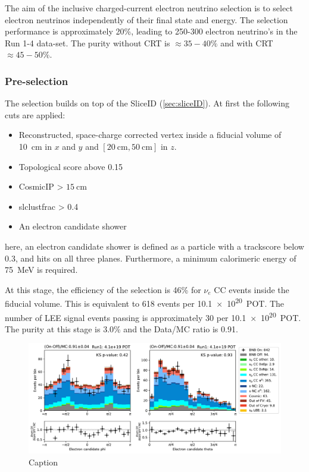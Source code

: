 \label{sec:nueselection:inclusive}

The aim of the inclusive charged-current electron neutrino selection is to select electron neutrinos independently of their final state and energy. The selection performance is approximately 20\%, leading to 250-300 electron neutrino's in the Run 1-4 data-set. The purity without CRT is $\approx 35-40\%$ and with CRT $\approx 45-50\%$.

\subsubsection{Pre-selection}
The selection builds on top of the SliceID (\cref{sec:sliceID}). At first the following cuts are applied:
\begin{itemize}
    \item Reconstructed, space-charge corrected vertex inside a fiducial volume of \SI{10}{\cm} in $x$ and $y$ and $[ \SI{20}{\cm}, \SI{50}{\cm}]$ in $z$.
    \item Topological score above 0.15
    \item CosmicIP > $\SI{15}{\cm}$
    \item slclustfrac > 0.4
    \item An electron candidate shower
\end{itemize}
here, an electron candidate shower is defined as a particle with a trackscore below 0.3, and hits on all three planes. Furthermore, a minimum calorimeric energy of \SI{75}{\MeV} is required. 

At this stage, the efficiency of the selection is 46\% for $\nu_e$ CC events inside the fiducial volume. This is equivalent to 618 events per \SI{10.1e20}{POT}. The number of LEE signal events passing is approximately 30 per \SI{10.1e20}{POT}. The purity at this stage is 3.0\% and the Data/MC ratio is 0.91.
\begin{figure}
    \centering
    \includegraphics[width=\textwidth]{NueCCsel/Images/run1/pre_angles.pdf}
    \caption{Caption}
    \label{fig:pre_shower_E_pdg}
\end{figure}

